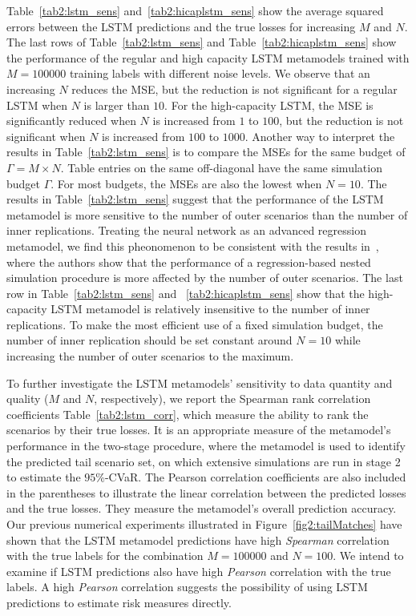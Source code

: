 Table~\ref{tab2:lstm_sens} and~\ref{tab2:hicaplstm_sens} show the average squared errors between the LSTM predictions and the true losses for increasing $M$ and $N$.
The last rows of Table~\ref{tab2:lstm_sens} and Table~\ref{tab2:hicaplstm_sens} show the performance of the regular and high capacity LSTM metamodels trained with $M=\num{100000}$ training labels with different noise levels.
We observe that an increasing $N$ reduces the MSE, but the reduction is not significant for a regular LSTM when $N$ is larger than $\num{10}$.
For the high-capacity LSTM, the MSE is significantly reduced when $N$ is increased from $\num{1}$ to $\num{100}$, but the reduction is not significant when $N$ is increased from $\num{100}$ to $\num{1000}$.
Another way to interpret the results in Table~\ref{tab2:lstm_sens} is to compare the MSEs for the same budget of $\Gamma = M \times N$. 
Table entries on the same off-diagonal have the same simulation budget $\Gamma$.
For most budgets, the MSEs are also the lowest when $N = 10$.
The results in Table~\ref{tab2:lstm_sens} suggest that the performance of the LSTM metamodel is more sensitive to the number of outer scenarios than the number of inner replications.
Treating the neural network as an advanced regression metamodel, we find this pheonomenon to be consistent with the results in~\cite{broadie2015risk}, where the authors show that the performance of a regression-based nested simulation procedure is more affected by the number of outer scenarios.
The last row in Table~\ref{tab2:lstm_sens} and ~\ref{tab2:hicaplstm_sens} show that the high-capacity LSTM metamodel is relatively insensitive to the number of inner replications.
To make the most efficient use of a fixed simulation budget, the number of inner replication should be set constant around $N=10$ while increasing the number of outer scenarios to the maximum.

To further investigate the LSTM metamodels' sensitivity to data quantity and quality ($M$ and $N$, respectively), we report the Spearman rank correlation coefficients Table~\ref{tab2:lstm_corr}, which measure the ability to rank the scenarios by their true losses.
It is an appropriate measure of the metamodel's performance in the two-stage procedure, where the metamodel is used to identify the predicted tail scenario set, on which extensive simulations are run in stage 2 to estimate the $95\%$-CVaR.
The Pearson correlation coefficients are also included in the parentheses to illustrate the linear correlation between the predicted losses and the true losses.
They measure the metamodel's overall prediction accuracy.
Our previous numerical experiments illustrated in Figure~\ref{fig2:tailMatches} have shown that the LSTM metamodel predictions have high \textit{Spearman} correlation with the true labels for the combination $M=\num{100000}$ and $N=\num{100}$.
We intend to examine if LSTM predictions also have high \textit{Pearson} correlation with the true labels.
A high \textit{Pearson} correlation suggests the possibility of using LSTM predictions to estimate risk measures directly.

